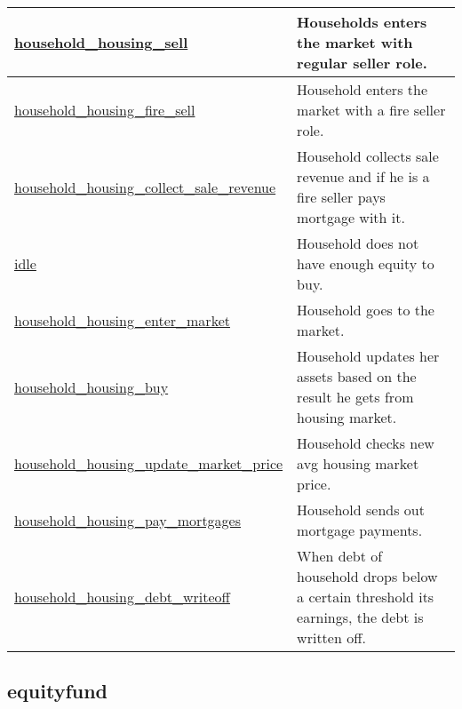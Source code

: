 \documentclass[a4paper,11pt]{article}
\begin{document}
\begin{longtable}[H!]{ll}
\midrule
\parbox{5cm}{\url{household_housing_sell}}  & \parbox{10cm}{Households enters the market with regular seller role.} \\
\midrule
\parbox{5cm}{\url{household_housing_fire_sell}}  & \parbox{10cm}{Household enters the market with a fire seller role.} \\
\midrule
\parbox{5cm}{\url{household_housing_collect_sale_revenue}}  & \parbox{10cm}{Household collects sale revenue and if he is a fire seller pays mortgage with it.} \\
\midrule
\parbox{5cm}{\url{idle}}  & \parbox{10cm}{Household does not have enough equity to buy.} \\
\midrule
\parbox{5cm}{\url{household_housing_enter_market}}  & \parbox{10cm}{Household goes to the market.} \\
\midrule
\parbox{5cm}{\url{household_housing_buy}}  & \parbox{10cm}{Household updates her assets based on the result he gets from housing market.} \\
\midrule
\parbox{5cm}{\url{household_housing_update_market_price}}  & \parbox{10cm}{Household checks new avg housing market price.} \\
\midrule
\parbox{5cm}{\url{household_housing_pay_mortgages}}  & \parbox{10cm}{Household sends out mortgage payments.} \\
\midrule
\parbox{5cm}{\url{household_housing_debt_writeoff}}  & \parbox{10cm}{When debt of household drops below a certain threshold its earnings, the debt is written off.} \\
\end{longtable}

\subsection{equityfund}
\end{document}
